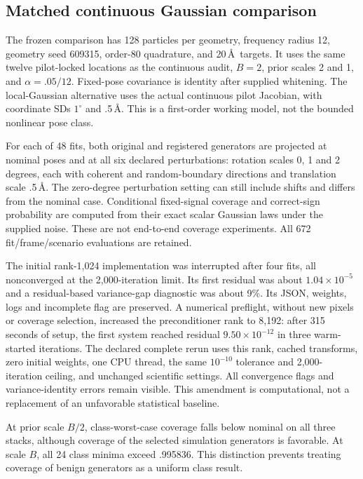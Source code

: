 \subsection{Matched continuous Gaussian comparison}
The frozen comparison has 128 particles per geometry, frequency radius 12,
geometry seed 609315, order-80 quadrature, and 20\,\AA\ targets. It uses the
same twelve pilot-locked locations as the continuous audit, $B=2$, prior
scales 2 and 1, and $\alpha=.05/12$. Fixed-pose covariance is identity after
supplied whitening. The local-Gaussian alternative uses the actual
continuous pilot Jacobian, with coordinate SDs $1^\circ$ and .5\,\AA.
This is a first-order working model, not the bounded nonlinear pose class.

For each of 48 fits, both original and registered generators are projected
at nominal poses and at all six declared perturbations: rotation scales
0, 1 and 2 degrees, each with coherent and random-boundary directions and
translation scale .5\,\AA. The zero-degree perturbation setting can still
include shifts and differs from the nominal case. Conditional fixed-signal
coverage and correct-sign probability are computed from their exact scalar
Gaussian laws under the supplied noise. These are not end-to-end coverage
experiments. All 672 fit/frame/scenario evaluations are retained.

The initial rank-1,024 implementation was interrupted after four fits, all
nonconverged at the 2,000-iteration limit. Its first residual was about
$1.04\times10^{-5}$ and a residual-based variance-gap diagnostic was about
9\%. Its JSON, weights, logs and incomplete flag are preserved. A numerical
preflight, without new pixels or coverage selection, increased the
preconditioner rank to 8,192: after 315 seconds of setup, the first system
reached residual $9.50\times10^{-12}$ in three warm-started iterations.
The declared complete rerun uses this rank, cached transforms, zero initial
weights, one CPU thread, the same $10^{-10}$ tolerance and 2,000-iteration
ceiling, and unchanged scientific settings. All convergence flags and
variance-identity errors remain visible. This amendment is computational,
not a replacement of an unfavorable statistical baseline.

At prior scale $B/2$, class-worst-case coverage falls below nominal on all
three stacks, although coverage of the selected simulation generators is
favorable. At scale $B$, all 24 class minima exceed .995836. This distinction
prevents treating coverage of benign generators as a uniform class result.

